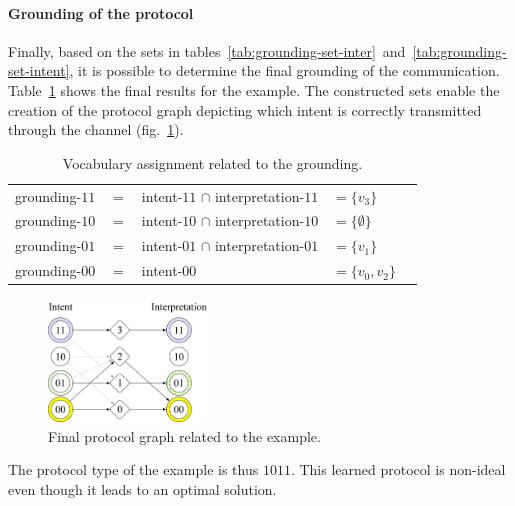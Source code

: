 \paragraph*{Grounding of the protocol}

Finally, based on the sets in tables~\ref{tab:grounding-set-inter}~and~\ref{tab:grounding-set-intent}, it is possible to determine the final grounding of the communication. Table~\ref{tab:grounding-grounding} shows the final results for the example. The constructed sets enable the creation of the protocol graph depicting which intent is correctly transmitted through the channel (fig.~\ref{fig:grounding-final}).

\begin{table}[ht]
    \centering
    \begin{tabular}{lllll}
    grounding-$11$ & $=$ & intent-$11$ $\cap$ interpretation-$11$ & $= \{v_3\}$ \\ 
    grounding-$10$ & $=$ & intent-$10$ $\cap$ interpretation-$10$ & $= \{\emptyset\}$ \\ 
    grounding-$01$ & $=$ & intent-$01$ $\cap$ interpretation-$01$ & $= \{v_1\}$ \\ 
    grounding-$00$ & $=$ & intent-$00$ & $= \{v_0, v_2\}$ \\ 
    \end{tabular}
    \caption{Vocabulary assignment related to the grounding.}
    \label{tab:grounding-grounding}
\end{table}

\begin{figure}[H]
    \vspace{0pt}
    \centering
    \includegraphics[width=0.375\textwidth]{imgs/grounding-final.png}
    \caption{Final protocol graph related to the example.}
    \label{fig:grounding-final}
\end{figure}

The protocol type of the example is thus $1011$. This learned protocol is non-ideal even though it leads to an optimal solution.
